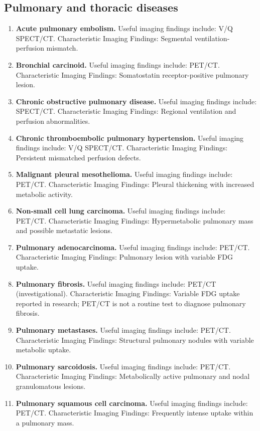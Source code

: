 \subsection{Pulmonary and thoracic diseases}
\begin{enumerate}[leftmargin=*,itemsep=0.45em,topsep=0.4em]
\item \textbf{Acute pulmonary embolism.} Useful imaging findings include: V/Q SPECT/CT. Characteristic Imaging Findings: Segmental ventilation-perfusion mismatch.
\item \textbf{Bronchial carcinoid.} Useful imaging findings include: PET/CT. Characteristic Imaging Findings: Somatostatin receptor-positive pulmonary lesion.
\item \textbf{Chronic obstructive pulmonary disease.} Useful imaging findings include: SPECT/CT. Characteristic Imaging Findings: Regional ventilation and perfusion abnormalities.
\item \textbf{Chronic thromboembolic pulmonary hypertension.} Useful imaging findings include: V/Q SPECT/CT. Characteristic Imaging Findings: Persistent mismatched perfusion defects.
\item \textbf{Malignant pleural mesothelioma.} Useful imaging findings include: PET/CT. Characteristic Imaging Findings: Pleural thickening with increased metabolic activity.
\item \textbf{Non-small cell lung carcinoma.} Useful imaging findings include: PET/CT. Characteristic Imaging Findings: Hypermetabolic pulmonary mass and possible metastatic lesions.
\item \textbf{Pulmonary adenocarcinoma.} Useful imaging findings include: PET/CT. Characteristic Imaging Findings: Pulmonary lesion with variable FDG uptake.
\item \textbf{Pulmonary fibrosis.} Useful imaging findings include: PET/CT (investigational). Characteristic Imaging Findings: Variable FDG uptake reported in research; PET/CT is not a routine test to diagnose pulmonary fibrosis.
\item \textbf{Pulmonary metastases.} Useful imaging findings include: PET/CT. Characteristic Imaging Findings: Structural pulmonary nodules with variable metabolic uptake.
\item \textbf{Pulmonary sarcoidosis.} Useful imaging findings include: PET/CT. Characteristic Imaging Findings: Metabolically active pulmonary and nodal granulomatous lesions.
\item \textbf{Pulmonary squamous cell carcinoma.} Useful imaging findings include: PET/CT. Characteristic Imaging Findings: Frequently intense uptake within a pulmonary mass.

\end{enumerate}
